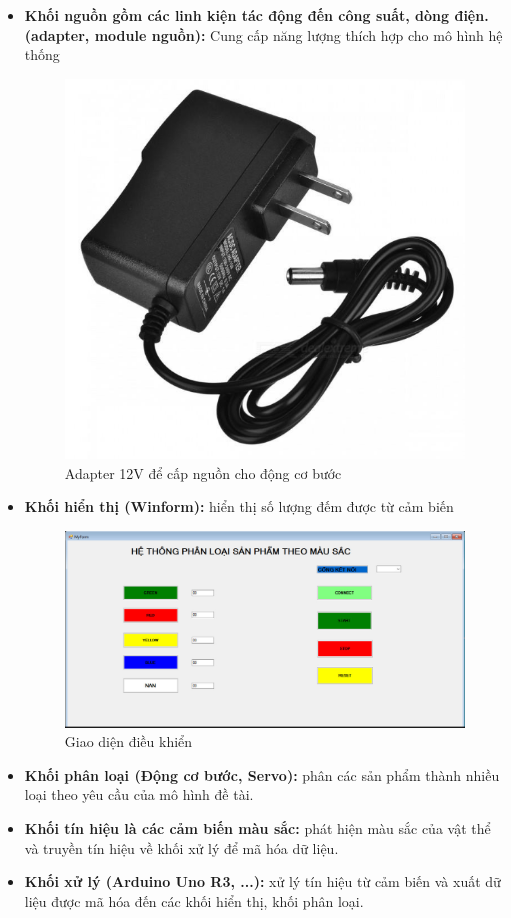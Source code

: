 \documentclass[12pt]{report}
\begin{document}
\begin{itemize}[itemsep=0pt, parsep=0pt]
    \item \textbf{Khối nguồn gồm các linh kiện tác động đến công suất, dòng điện. (adapter, module nguồn):} Cung cấp năng lượng thích hợp cho mô hình hệ thống

    \begin{figure}[H]
        \centering
        \includegraphics[width=0.5\linewidth]{image/KhoiNguon.png}
        \caption{Adapter 12V để cấp nguồn cho động cơ bước}
    \end{figure}
    
    \item \textbf{Khối hiển thị (Winform):} hiển thị số lượng đếm được từ cảm biến

    \begin{figure}[H]
        \centering
        \includegraphics[width=1\linewidth]{image/KhoiGiaoDien.jpg}
        \caption{Giao diện điều khiển}
    \end{figure}
    
    \item \textbf{Khối phân loại (Động cơ bước, Servo):} phân các sản phẩm thành nhiều loại theo yêu cầu của mô hình đề tài.
    
    \item \textbf{Khối tín hiệu là các cảm biến màu sắc:} phát hiện màu sắc của vật thể và truyền tín hiệu về khối xử lý để mã hóa dữ liệu.
    
    \item \textbf{Khối xử lý (Arduino Uno R3, ...):} xử lý tín hiệu từ cảm biến và xuất dữ liệu được mã hóa đến các khối hiển thị, khối phân loại.
    
\end{itemize}
\end{document}
